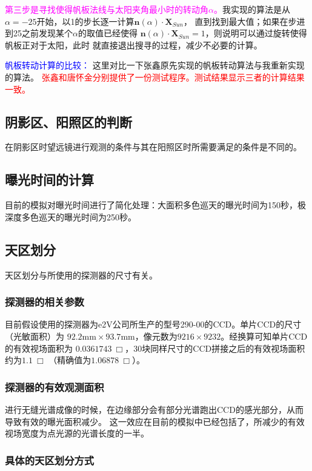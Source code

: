 \documentclass[a4paper,11pt]{ctexart}
\newcommand{\RT}[1]{\textcolor{red}{#1}}
\newcommand{\BT}[1]{\textcolor{blue}{#1}}
\newcommand{\MT}[1]{\textcolor{magenta}{#1}}
\begin{document}
\MT{\heiti 第三步是寻找使得帆板法线与太阳夹角最小时的转动角$\alpha$。}我实现的算法是从
$\alpha=-25$\textdegree 开始，以1\textdegree 的步长逐一计算$\bm{n}(\alpha)\cdot\bm{X}_{Sun}$，
直到找到最大值；如果在步进到25\textdegree 之前发现某个$\alpha$的取值已经使得
$\bm{n}(\alpha)\cdot\bm{X}_{Sun}=1$，则说明可以通过旋转使得帆板正对于太阳，此时
就直接退出搜寻的过程，减少不必要的计算。

\BT{\heiti 帆板转动计算的比较：}
这里对比一下张鑫原先实现的帆板转动算法与我重新实现的算法。
\RT{张鑫和唐怀金分别提供了一份测试程序。测试结果显示三者的计算结果一致。}


\subsection{阴影区、阳照区的判断}
在阴影区时望远镜进行观测的条件与其在阳照区时所需要满足的条件是不同的。

\subsection{曝光时间的计算}
目前的模拟对曝光时间进行了简化处理：大面积多色巡天的曝光时间为150秒，极深度多色巡天的曝光时间为250秒。


\subsection{天区划分}

天区划分与所使用的探测器的尺寸有关。

\subsubsection{探测器的相关参数}
目前假设使用的探测器为e2V公司所生产的型号290-00的CCD。单片CCD的尺寸（光敏面积）为
$92.2\text{mm}\times93.7\text{mm}$，像元数为$9216\times 9232$。经换算可知单片CCD的有效视场面积为
$0.0361743~\Box$\textdegree，30块同样尺寸的CCD拼接之后的有效视场面积约为$1.1~\Box$\textdegree
（精确值为$1.06878~\Box$\textdegree）。

\subsubsection{探测器的有效观测面积}

进行无缝光谱成像的时候，在边缘部分会有部分光谱跑出CCD的感光部分，从而导致有效的曝光面积减少。
这一效应在目前的模拟中已经包括了，所减少的有效视场宽度为点光源的光谱长度的一半。

\subsubsection{具体的天区划分方式}
\end{document}
